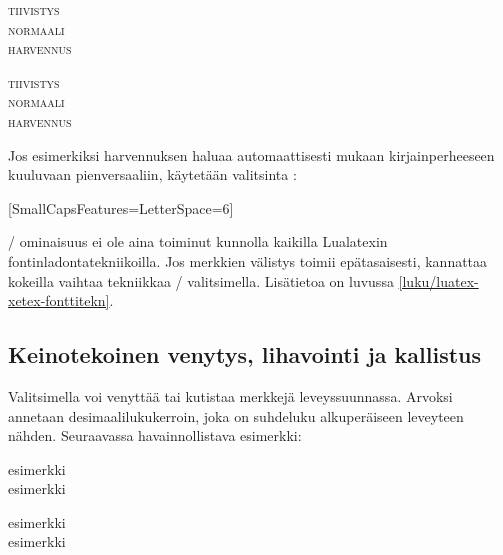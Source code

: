 \begin{koodilohkosis}
\scshape { tiivistys} \\
normaali \\ { harvennus}
\end{koodilohkosis}

\begin{tulossis}
  \scshape { tiivistys} \\
  normaali \\ { harvennus}
\end{tulossis}

\noindent
Jos esimerkiksi harvennuksen haluaa automaattisesti mukaan
kirjainperheeseen kuuluvaan pienversaaliin, käytetään valitsinta
:

\begin{koodilohkosis}
\setmainfont{…}[SmallCapsFeatures={LetterSpace=6}]
\end{koodilohkosis}

\noindent
{}\-/ ominaisuus ei ole aina toiminut kunnolla
kaikilla Lualatexin fontinladontatekniikoilla. Jos merkkien välistys
toimii epätasaisesti, kannattaa kokeilla vaihtaa tekniikkaa
\-/ valitsimella. Lisätietoa on luvussa
\ref{luku/luatex-xetex-fonttitekn}.

\subsection{Keinotekoinen venytys, lihavointi ja kallistus}
\label{luku/fontit-venytys}

Valitsimella  voi venyttää tai kutistaa merkkejä
leveyssuunnassa. Arvoksi annetaan desimaalilukukerroin, joka on
suhdeluku alkuperäiseen leveyteen nähden. Seuraavassa havainnollistava
esimerkki:

\begin{koodilohkosis}
esimerkki \\
{ esimerkki}
\end{koodilohkosis}

\begin{tulossis}
  esimerkki \\
  { esimerkki}
\end{tulossis}

